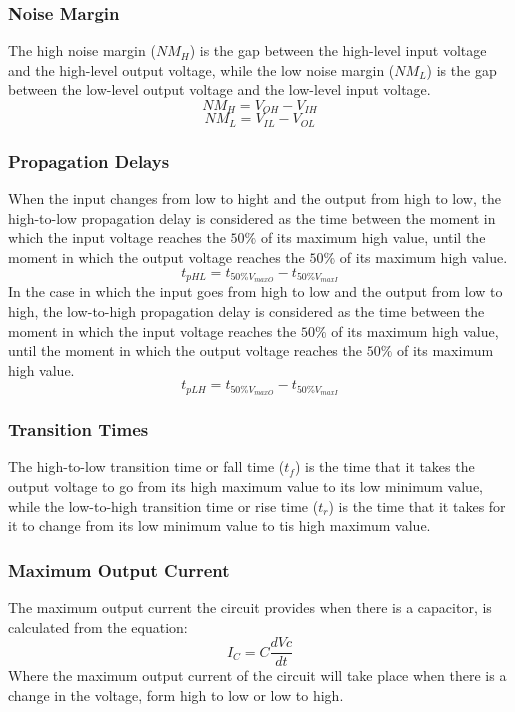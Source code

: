 \subsubsection{\color{red}Noise Margin}
The high noise margin ($NM_{H}$) is the gap between the high-level input voltage and the high-level output voltage, while the low noise margin ($NM_{L}$) is the gap between the low-level output voltage and the low-level input voltage.
$$NM_{H} = V_{OH} - V_{IH}$$
$$NM_{L} = V_{IL} - V_{OL}$$


\subsubsection{\color{red}Propagation Delays}
When the input changes from low to hight and the output from high to low, the high-to-low propagation delay is considered as the time between the moment in which the input voltage reaches the $50\% $ of its maximum high value, until the moment in which the output voltage reaches the $50\%$ of its maximum high value.
$$t_{pHL} = t_{50\%V_{maxO}} - t_{50\%V_{maxI}}$$
In the case in which the input goes from high to low and the output from low to high, the low-to-high propagation delay is considered as the time between the moment in which the input voltage reaches the $50\%$ of its maximum high value, until the moment in which the output voltage reaches the $50\%$ of its maximum high value.
$$t_{pLH} = t_{50\%V_{maxO}} - t_{50\%V_{maxI}}$$

\subsubsection{\color{red}Transition Times}
The high-to-low transition time or fall time ($t_{f}$) is the time that it takes the output voltage to go from its high maximum value to its low minimum value, while the low-to-high transition time or rise time ($t_{r}$) is the time that it takes for it to change from its low minimum value to tis high maximum value.


\subsubsection {\color{red}Maximum Output Current}
The maximum output current the circuit provides when there is a capacitor, is calculated from the equation:
$${I_C}=C\frac{dVc}{dt}$$
Where the maximum output current of the circuit will take place when there is a change in the voltage, form high to low or low to high. 

